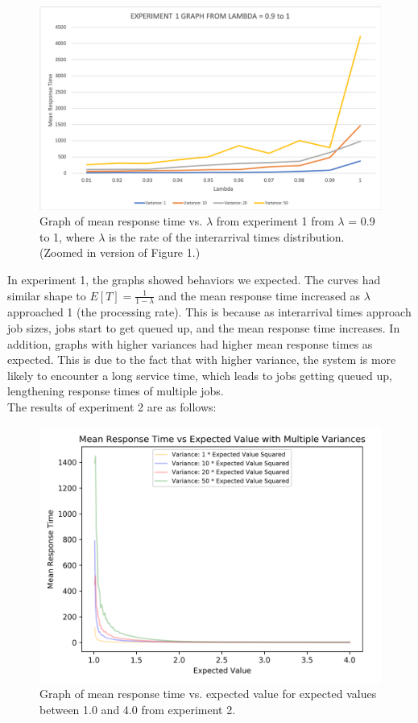 \documentclass[12pt]{article}
\begin{document}
\begin{figure}[H]
\includegraphics[scale = 0.6]{Graph1ZoomedIn.png}
\caption{Graph of mean response time vs. $\lambda$ from experiment 1 from $\lambda$ = 0.9 to 1, where $\lambda$ is the rate of the interarrival times distribution. (Zoomed in version of Figure 1.)}
\end{figure}
\pagebreak
In experiment 1, the graphs showed behaviors we expected. The curves had similar shape to $E[T] = \frac{1}{1-\lambda}$ and the mean response time increased as $\lambda$ approached 1 (the processing rate). This is because as interarrival times approach job sizes, jobs start to get queued up, and the mean response time increases. In addition, graphs with higher variances had higher mean response times as expected. This is due to the fact that with higher variance, the system is more likely to encounter a long service time, which leads to jobs getting queued up, lengthening response times of multiple jobs. \\

The results of experiment 2 are as follows:

\begin{figure}[H]
\includegraphics[width=\linewidth]{Analysis2_1.png}
\caption{Graph of mean response time vs. expected value for expected values between 1.0 and 4.0 from experiment 2.}
\end{figure}
\end{document}
